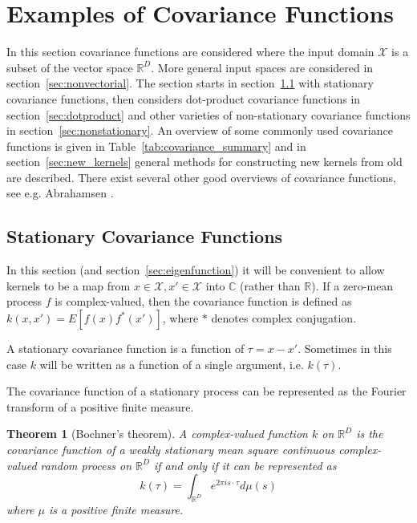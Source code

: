 \documentclass[11pt]{book}
\newtheorem{theorem}{Theorem}[chapter]
\begin{document}
\section{Examples of Covariance Functions}
\label{sec:examples}

In this section covariance functions are considered where the input domain $\mathcal{X}$ is a subset of the vector space $\mathbb{R}^D$. More general input spaces are considered in section~\ref{sec:nonvectorial}. The section starts in section~\ref{sec:stationary} with stationary covariance functions, then considers dot-product covariance functions in section~\ref{sec:dotproduct} and other varieties of non-stationary covariance functions in section~\ref{sec:nonstationary}. An overview of some commonly used covariance functions is given in Table~\ref{tab:covariance_summary} and in section~\ref{sec:new_kernels} general methods for constructing new kernels from old are described. There exist several other good overviews of covariance functions, see e.g. Abrahamsen \cite{abrahamsen1997}.

\subsection{Stationary Covariance Functions}
\label{sec:stationary}

In this section (and section~\ref{sec:eigenfunction}) it will be convenient to allow kernels to be a map from $x \in \mathcal{X}, x' \in \mathcal{X}$ into $\mathbb{C}$ (rather than $\mathbb{R}$). If a zero-mean process $f$ is complex-valued, then the covariance function is defined as $k(x, x') = E[f(x) f^*(x')]$, where $*$ denotes complex conjugation.

A stationary covariance function is a function of $\tau = x - x'$. Sometimes in this case $k$ will be written as a function of a single argument, i.e. $k(\tau)$.

The covariance function of a stationary process can be represented as the Fourier transform of a positive finite measure.

\begin{theorem}[Bochner's theorem]
\label{thm:bochner}
A complex-valued function $k$ on $\mathbb{R}^D$ is the covariance function of a weakly stationary mean square continuous complex-valued random process on $\mathbb{R}^D$ if and only if it can be represented as
\begin{equation}
\label{eq:bochner}
k(\tau) = \int_{\mathbb{R}^D} e^{2\pi i s \cdot \tau} d\mu(s)
\end{equation}
where $\mu$ is a positive finite measure.
\end{theorem}
\end{document}
